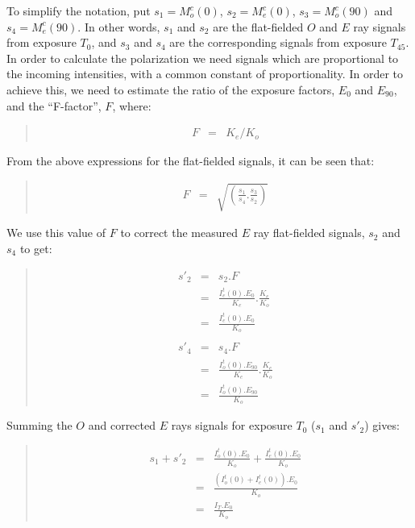 \documentclass[twoside,11pt]{starlink}
\newenvironment{myquote}{\begin{quote}\begin{small}}{\end{small}\end{quote}}
\begin{document}
To simplify the notation, put $s_{1}=M^{c}_{o}(0)$, $s_{2}=M^{c}_{e}(0)$,
$s_{3}=M^{c}_{o}(90)$ and $s_{4}=M^{c}_{e}(90)$. In other words, $s_{1}$ and
$s_{2}$ are the flat-fielded $O$ and $E$ ray signals from exposure
$T_{0}$, and $s_{3}$ and $s_{4}$ are the corresponding signals from
exposure $T_{45}$. In order to calculate the polarization we need signals
which are proportional to the incoming intensities, with a common
constant of proportionality. In order to achieve this, we need to
estimate the ratio of the exposure factors, $E_{0}$ and $E_{90}$, and the
``F-factor'', $F$, where:

\begin{myquote}
\begin{eqnarray*}
   F & = & K_{e}/K_{o}
\end{eqnarray*}
\end{myquote}


From the above expressions for the flat-fielded signals, it can be seen
that:

\begin{myquote}
\begin{eqnarray*}
   F & = & \sqrt {\left( \frac {s_{1}}{s_{4}} . \frac {s_{3}}{s_{2}} \right)}
\end{eqnarray*}
\end{myquote}

We use this value of $F$ to correct the measured $E$ ray flat-fielded
signals, $s_{2}$ and $s_{4}$ to get:

\begin{myquote}
\begin{eqnarray*}
   s'_{2} & = & s_{2} . F \\
         & = & \frac{ I^{t}_{e}(0).E_{0} }{ K_{e} } . \frac {K_{e}}{K_{o}} \\
         & = & \frac{ I^{t}_{e}(0).E_{0} }{ K_{o} } \\ \\
   s'_{4} & = & s_{4} . F \\
         & = & \frac{ I^{t}_{o}(0).E_{90} }{ K_{e} } . \frac {K_{e}}{K_{o}} \\
         & = & \frac{ I^{t}_{o}(0).E_{90} }{ K_{o} }
\end{eqnarray*}
\end{myquote}

Summing the $O$ and corrected $E$ rays signals for exposure $T_{0}$
($s_{1}$ and $s'_{2}$) gives:

\begin{myquote}
\begin{eqnarray*}
   s_{1} + s'_{2} & = & \frac{ I^{t}_{o}(0).E_{0} }{ K_{o} } +
                        \frac{ I^{t}_{e}(0).E_{0} }{ K_{o} } \\
                  & = & \frac{ ( I^{t}_{o}(0) + I^{t}_{e}(0) ).E_{0} }{ K_{o} } \\
                  & = & \frac{ I_{T}.E_{0} }{ K_{o} }
\end{eqnarray*}
\end{myquote}
\end{document}
